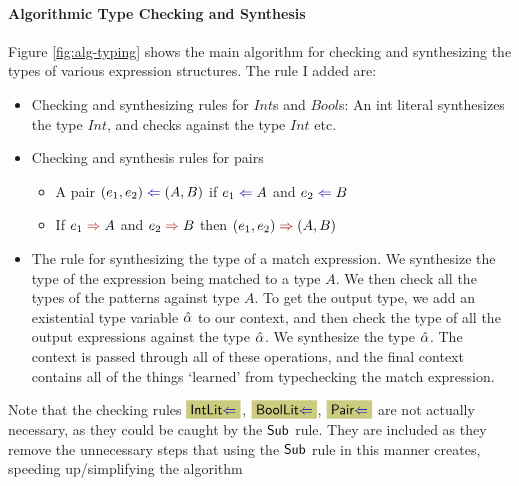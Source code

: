 \paragraph{Algorithmic Type Checking and Synthesis} Figure \ref{fig:alg-typing} shows the main algorithm for checking and synthesizing the types of various expression structures. The rule I added are:
\begin{itemize}
    \item Checking and synthesizing rules for $Int$s and $Bool$s: An int literal synthesizes the type $Int$, and checks against the type $Int$ etc.
    \item Checking and synthesis rules for pairs
    \begin{itemize}
        \item A pair $(e_1, e_2) \chk (A, B)$ if $e_1 \chk A$ and $e_2 \chk B$
        \item If $e_1 \syn A$ and $e_2 \syn B$ then $(e_1, e_2) \syn (A, B)$
    \end{itemize}
    \item The rule for synthesizing the type of a match expression. We synthesize the type of the expression being matched to a type $A$. We then check all the types of the patterns against type $A$. To get the output type, we add an existential type variable $\hat{\alpha}$ to our context, and then check the type of all the output expressions against the type $\hat{\alpha}$. We synthesize the type $\hat{\alpha}$. The context is passed through all of these operations, and the final context contains all of the things `learned' from typechecking the match expression.
\end{itemize}

Note that the checking rules $\MyTCRule{\Intcheckrulename}$, $\MyTCRule{\Boolcheckrulename}$, $\MyTCRule{\Paircheckrulename}$ are not actually necessary, as they could be caught by the $\text{\normalfont\textsf{Sub}}$ rule. They are included as they remove the unnecessary steps that using the $\text{\normalfont\textsf{Sub}}$ rule in this manner creates, speeding up/simplifying the algorithm

\pagebreak


